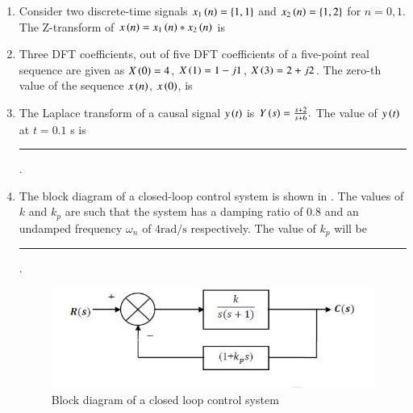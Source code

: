 \documentclass[journal,12pt,onecolumn]{IEEEtran}
\theoremstyle{remark}
\begin{document}
\begin{enumerate}
\item Consider two discrete-time signals   
$x_1\left(n\right) = \left\{1, 1\right\}$ and $x_2 \left(n\right) = \{1, 2\}$ for $n = 0, 1$.\\ 
The Z-transform of $x \left(n\right) = x_1 \left(n\right) * x_2 \left(n\right)$ is \par \hfill{}
\begin{enumerate}
\end{enumerate}

\item Three DFT coefficients, out of five DFT coefficients of a five-point real sequence are given as $X \left(0\right) = 4$, $X \left(1\right) = 1 - j1$, $X \left(3\right) = 2 + j2$.  
The zero-th value of the sequence $x\left(n\right)$, $x \left(0\right)$, is \par \hfill{}
\begin{enumerate}
\end{enumerate}

\item The Laplace transform of a causal signal $y\left(t\right)$ is $Y \left(s\right) = \frac{s+2}{s+6}.$  
The value of $y\left(t\right)$ at $t = 0.1$ s is \rule{1.5cm}{0.4pt}. \par \hfill{}

\item The block diagram of a closed-loop control system is shown in . The values of $k$ and $k_p$ are such that the system has a damping ratio of $0.8$ and an undamped frequency $\omega_n$ of $4\text{rad/s}$ respectively. The value of $k_p$ will be \rule{1.5cm}{0.4pt}. \par \hfill{}
\begin{figure}[H]
    \centering
    \includegraphics[width=0.6\columnwidth]{Figs/Q-36.png}
    \caption{Block diagram of a closed loop control system}
    \label{fig:placeholder_15}
\end{figure}



\end{enumerate}
\end{document}
